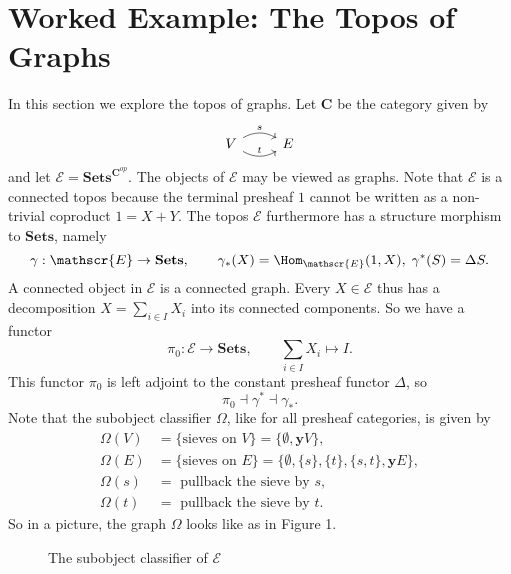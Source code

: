 %
%

\section{Worked Example: The Topos of Graphs}

In this section we explore the topos of graphs. Let $\mathbf{C}$ be the category given by
\[ \begin{tikzcd}
 V \arrow[r, bend left, "s"] \arrow[r, bend right, "t"] & E
\end{tikzcd} \]
and let $\mathscr{E} = \mathbf{Sets}^{\mathbf{C}^{op}}$. The objects of $\mathscr{E}$ may be viewed as graphs. Note that $\mathscr{E}$ is a connected topos because the terminal presheaf $1$ cannot be written as a non-trivial coproduct $1 = X + Y$. The topos $\mathscr{E}$ furthermore has a structure morphism to $\mathbf{Sets}$, namely
\[ \gamma : \mathscr{E} \to \mathbf{Sets}, \qquad \gamma_*(X) = \Hom_{\mathscr{E}}(1,X), \; \gamma^*(S) = \Delta S. \]
A connected object in $\mathscr{E}$ is a connected graph. Every $X \in \mathscr{E}$ thus has a decomposition $X = \sum_{i \in I} X_i$ into its connected components. So we have a functor
\[ \pi_0 : \mathscr{E} \to \mathbf{Sets}, \qquad \sum_{i \in I} X_i \mapsto I. \]
This functor $\pi_0$ is left adjoint to the constant presheaf functor $\Delta$, so
\[ \pi_0 \dashv \gamma^* \dashv \gamma_*. \]
Note that the subobject classifier $\Omega$, like for all presheaf categories, is given by
\begin{align*}
\Omega(V) &= \{ \text{sieves on } V \} = \{\emptyset, \mathbf{y}V \}, \\
\Omega(E) &= \{ \text{sieves on } E \} = \{\emptyset, \{s\}, \{t\}, \{s,t\}, \mathbf{y}E \}, \\
\Omega(s) &= \text{ pullback the sieve by } s, \\
\Omega(t) &= \text{ pullback the sieve by } t.
\end{align*}
So in a picture, the graph $\Omega$ looks like as in Figure 1.

\begin{figure}
\centering
{}
\caption{The subobject classifier of $\mathscr{E}$}
\end{figure}

